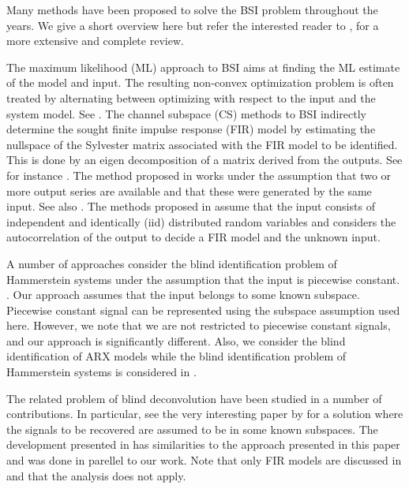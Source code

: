 \documentclass{ifacconf}
\newcommand{\0}{{\bf 0}}
\begin{document}
Many methods have been proposed to solve the BSI problem throughout
the years. We give a short overview here but refer the interested
reader to  \cite{Abed97,Hua02}, for a more extensive and complete review. 

The maximum likelihood (ML) approach to BSI aims at finding the ML
estimate of the model and input. The resulting non-convex optimization
problem is often treated by alternating between optimizing with respect to
the input and the system model.  See \cite{meraim:EUSIPCO:1994}. The
channel subspace (CS) methods to BSI  indirectly determine the sought
finite impulse response (FIR)  model by estimating the nullspace of
the Sylvester matrix associated with the FIR model to be identified. This is
done by an eigen decomposition of a matrix derived from the
outputs. See for instance \cite{Abed-Meraim:06}.
The method proposed in \cite{Zerva00} works under the assumption that
two or more output series are available and that these were generated
by the same input. See also \cite{Van13}. The methods proposed in \cite{Sato75,Tong91}
assume that the input consists of  independent and identically
(iid)  distributed random variables and considers the autocorrelation of the
output to decide a FIR model and the unknown
input. 

A number of approaches consider the blind identification problem of
Hammerstein systems under the assumption that the input is piecewise
constant. \cite{Sun99,BaiLD02,Bai02,Wang07,Wang09,Wang10}. Our approach assumes that the input belongs to
some known subspace.  Piecewise constant signal can be represented
using the subspace assumption used here. However, we note that we
are not restricted to piecewise constant signals, and our approach is
significantly different. Also, we consider the blind identification of
ARX models while the blind identification problem of
Hammerstein systems is considered in
\cite{Sun99,BaiLD02,Bai02,Wang07,Wang09,Wang10}.  























The related problem of blind deconvolution have
been studied in a number of contributions. In particular,  see the
very interesting paper by
\cite{Ahmed:12} for a solution where the signals to be recovered are
assumed to be in some known subspaces. The development presented in
\cite{Ahmed:12} has similarities to the approach presented in this
paper and was done in parellel to our work. Note that only FIR models
are discussed in \cite{Ahmed:12}  and that the analysis does not apply.
\end{document}
